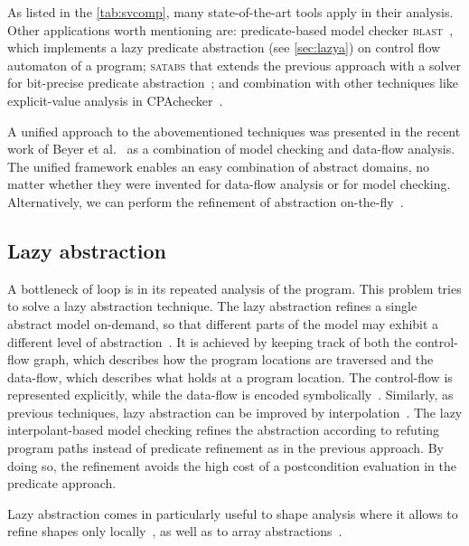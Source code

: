 As listed in the \autoref{tab:svcomp}, many state-of-the-art tools apply \cegar
in their analysis. Other applications worth mentioning are: predicate-based
model checker \textsc{blast}~\cite{Henzinger2003, Beyer2005checking}, which
implements a lazy predicate abstraction (see \autoref{sec:lazya}) on control
flow automaton of a program; \textsc{satabs} that extends the previous approach
with a \sat solver for bit-precise predicate
abstraction~\cite{Clarke2005satabs}; and combination with other techniques like
explicit-value analysis in CPAchecker~\cite{Beyer2013, Beyer2018e}.

A unified approach to the abovementioned techniques was presented in the recent
work of Beyer et al.~\cite{Beyer2018b} as a combination of model checking and
data-flow analysis. The unified framework enables an easy combination of
abstract domains, no matter whether they were invented for data-flow analysis
or for model checking. Alternatively, we can perform the refinement of abstraction
on-the-fly~\cite{Beyer2008program}.

\subsection{Lazy abstraction}
\label{sec:lazya}

A bottleneck of \cegar loop is in its repeated analysis of the program. This
problem tries to solve a lazy abstraction technique. The lazy abstraction
refines a single abstract model on-demand, so that different parts of the model
may exhibit a different level of abstraction~\cite{Henzinger2002}.
It is achieved by keeping track of both the control-flow graph, which describes how
the program locations are traversed and the data-flow, which describes what
holds at a program location. The control-flow is represented explicitly, while
the data-flow is encoded symbolically~\cite{Alberti2012}.
Similarly, as previous techniques, lazy abstraction can be improved by
interpolation~\cite{McMillan2006}. The lazy interpolant-based model checking
refines the abstraction according to refuting program paths instead of
predicate refinement as in the previous approach. By doing so, the refinement
avoids the high cost of a postcondition evaluation in the predicate approach.

Lazy abstraction comes in particularly useful to shape analysis where it allows
to refine shapes only locally~\cite{Henzinger2003,Beyer2006a}, as well as to
array abstractions~\cite{Alberti2012, Alberti2012b}.

